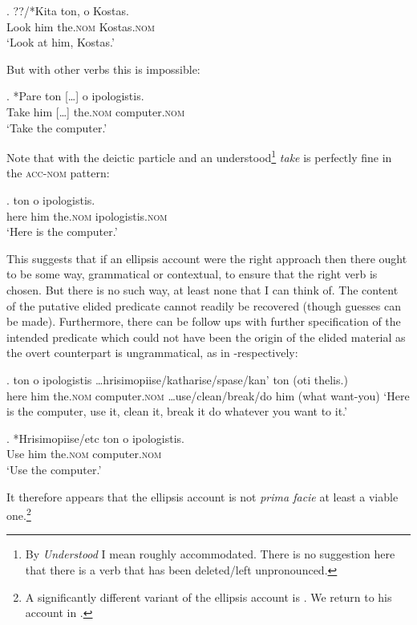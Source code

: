 \documentclass[output=paper]{LSP/langsci}
\begin{document}
\exg.
??/*Kita ton, o Kostas.\\
Look him the.\textsc{nom} Kostas.\textsc{nom}\\
\glt `Look at him, Kostas.'

But with other verbs this is impossible:

\exg.
*Pare ton [\ldots]  o ipologistis.\\
Take him [\ldots] the.\textsc{nom} computer.\textsc{nom}\\
\glt `Take the computer.'

Note that \Last with  the deictic particle and an understood\footnote{By \textit{Understood} I mean roughly accommodated. There is no suggestion here that there is a verb that has been deleted/left unpronounced.} \textit{take} is perfectly fine in the \textsc{acc}-\textsc{nom} pattern:

\exg.
\na  ton o ipologistis.\\
here him the.\textsc{nom} ipologistis.\textsc{nom}\\
\glt `Here is the computer.'

This suggests that if an ellipsis account were the right approach then there ought to be some way, grammatical or contextual, to ensure that the right verb is chosen.  But there is no such way, at least none that I can think of. The content of the putative elided predicate cannot readily be recovered (though guesses can be made).  Furthermore, there can be follow ups with further specification of the intended predicate which could not have been the origin of the elided material as the overt counterpart is ungrammatical, as in \Next-\NNext respectively:

\Lsciex.
\na ton o ipologistis \ldots  hrisimopiise/katharise/spase/kan' ton (oti thelis.)\\
here him the.\textsc{nom} computer.\textsc{nom} \ldots use/clean/break/do him (what want-you)
\glt `Here is the computer, use it, clean it, break it do whatever you want to it.'

\exg.
*Hrisimopiise/etc ton o ipologistis.\\
Use him the.\textsc{nom} computer.\textsc{nom}\\
\glt `Use the computer.'


It therefore appears that the ellipsis account is not \textit{prima facie} at least a viable one.\footnote{A significantly different variant of the ellipsis account is \citet{joseph:81}.  We return to his account in .}  
\end{document}
